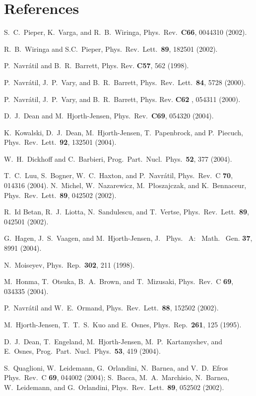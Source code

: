 \documentclass[12pt]{iopart}
\begin{document}
\section*{References}
\begin{thebibliography}{200}


 S.~C.~Pieper, K.~Varga, and R.~B.~Wiringa, Phys.~Rev.~{\bf C66},
0044310 (2002). 

  R.~B.~Wiringa and S.C.~Pieper, Phys.~Rev.~Lett.~{\bf 89},
182501 (2002). 

 P.~Navr\'atil and B.~R.~Barrett, Phys. Rev. {\bf C57}, 562 (1998).

 P.~Navr\'atil, J.~P.~Vary, and B.~R.~Barrett,
Phys.~Rev.~Lett.~{\bf 84}, 5728 (2000).

 P.~Navr\'atil, J.~P.~Vary, and B.~R.~Barrett, 
Phys. Rev. {\bf C62 }, 054311 (2000).

 D.~J.~Dean  and M.~Hjorth-Jensen,
Phys.~Rev.~{\bf C69}, 054320 (2004).
 
 K.~Kowalski, D.~J.~Dean, M.~Hjorth-Jensen, T.~Papenbrock,
and P.~Piecuch, Phys.~Rev.~Lett.~{\bf 92}, 132501 (2004).

 W.~H.~Dickhoff and C.~Barbieri, Prog.~Part.~Nucl.~Phys.~{\bf 52},
377 (2004).

 T.~C.~Luu, S.~Bogner, W.~C.~Haxton, and P.~Navr\'atil, 
Phys.~Rev.~C {\bf 70}, 014316 (2004).
 N.~Michel, W.~Nazarewicz, M.~P{\l}oszajczak, and K.~Bennaceur, 
                 Phys.~Rev.~Lett.~{\bf 89}, 042502 (2002).

R.~Id Betan, R.~J.~Liotta, N.~Sandulescu, and T.~Vertse, 
                 Phys.~Rev.~Lett.~{\bf 89}, 042501 (2002).

 G.~Hagen, J.~S.~Vaagen, and M.~Hjorth-Jensen,
  J. ~Phys. ~A: ~Math.~ Gen. {\bf 37}, 8991 (2004).

 N.~Moiseyev, Phys.~Rep.~{\bf 302}, 211 (1998). 

 M.~Honma, T.~Otsuka, B.~A.~Brown, and T.~Mizusaki, Phys.~Rev.~C {\bf 69},
034335 (2004).

 P.~Navr\'atil and W.~E.~Ormand, Phys.~Rev.~Lett.~{\bf 88},
152502  (2002).

  M.\ Hjorth-Jensen, T.~T.~S.~Kuo and E.~Osnes,
Phys.~Rep.~{\bf 261}, 125 (1995).

 D.~J.~Dean, T.~Engeland, M.~Hjorth-Jensen, M.~P.~Kartamyshev,
and E.~Osnes, Prog.~Part.~Nucl.~Phys.~{\bf 53}, 419 (2004).

S.~Quaglioni, W.~Leidemann, G.~Orlandini, N.~Barnea, 
and V.~D.~Efros
Phys.~Rev.~C {\bf 69}, 044002 (2004);
S.~Bacca, M.~A.~Marchisio, N.~Barnea, W.~Leidemann, and G.~Orlandini,
Phys.~Rev.~Lett.~{\bf 89}, 052502 (2002).   


\end{thebibliography}
\end{document}
